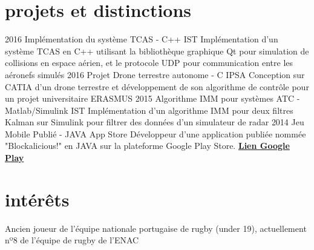 \documentclass[a4paper]{friggeri-cv} %
\begin{document}
\section{projets et distinctions}

\begin{entrylist}



\entry
{2016}
{Implémentation du système TCAS - C++}
{IST}
{Implémentation d'un système TCAS en C++ utilisant la bibliothèque graphique Qt pour simulation de collisions en espace aérien, et le protocole UDP pour communication entre les aéronefs simulés}
\entry
{2016}
{Projet Drone terrestre autonome - C}
{IPSA}
{Conception sur CATIA d'un drone terrestre et développement de son algorithme de contrôle pour un projet universitaire ERASMUS}
\entry
{2015}
{Algorithme IMM pour systèmes ATC - Matlab/Simulink}
{IST}
{Implémentation d'un algorithme IMM pour deux filtres Kalman sur Simulink pour filtrer des données d'un simulateur de radar}
\entry
{2014}
{Jeu Mobile Publié - JAVA}
{App Store}
{Développeur d'une application publiée nommée "Blockalicious!" en JAVA sur la plateforme Google Play Store.
\href{https://play.google.com/store/apps/details?id=com.guiero.blockaliciousfinal}{\textbf{Lien Google Play}}}
\end{entrylist}




\section{intérêts}

Ancien joueur de l'équipe nationale portugaise de rugby (under 19), actuellement nº8 de l'équipe de rugby de l'ENAC

\end{document}
